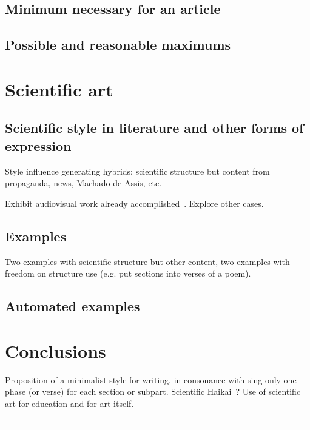 \documentclass[a4paper, 11pt]{article} %
\begin{document}
\subsection*{Minimum necessary for an article}

\subsection*{Possible and reasonable maximums}

\section*{Scientific art}

\subsection*{Scientific style in literature and other forms of expression}
Style influence generating hybrids: scientific structure but content from propaganda, news, Machado de Assis, etc.

Exhibit audiovisual work already accomplished~\cite{preludio,fourHubs}. Explore other cases.

\subsection*{Examples}
Two examples with scientific structure but other content, two examples with freedom on structure use (e.g. put sections into verses of a poem).

\subsection*{Automated examples}

\section*{Conclusions}
Proposition of a minimalist style for writing, in consonance with sing only one phase (or verse) for each section or subpart. Scientific Haikai~\cite{haikai}? Use of scientific art for education and for art itself.

----------------------------------------------------------------------------------------

%



\end{document}
